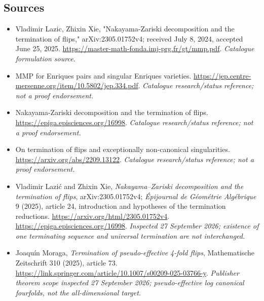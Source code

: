 \documentclass[11pt,a4paper]{article}
\numberwithin{equation}{section}
\begin{document}
\needspace{170mm}
\subsection{Sources}
\begin{itemize}\raggedright
\item[\textnormal{[S1]}]\hypertarget{source:72:1}{} Vladimir Lazic, Zhixin Xie, "Nakayama-Zariski decomposition and the termination of flips," arXiv:2305.01752v4; received July 8, 2024, accepted June 25, 2025.
\url{https://master-math-fonda.imj-prg.fr/gt/mmp.pdf}.
{\small\textit{Catalogue formulation source.}}
\item[\textnormal{[S2]}]\hypertarget{source:72:2}{} MMP for Enriques pairs and singular Enriques varieties.
\url{https://jep.centre-mersenne.org/item/10.5802/jep.334.pdf}.
{\small\textit{Catalogue research/status reference; not a proof endorsement.}}
\item[\textnormal{[S3]}]\hypertarget{source:72:3}{} Nakayama-Zariski decomposition and the termination of flips.
\url{https://epiga.episciences.org/16998}.
{\small\textit{Catalogue research/status reference; not a proof endorsement.}}
\item[\textnormal{[S4]}]\hypertarget{source:72:4}{} On termination of flips and exceptionally non-canonical singularities.
\url{https://arxiv.org/abs/2209.13122}.
{\small\textit{Catalogue research/status reference; not a proof endorsement.}}
\item[\textnormal{[E1]}]\hypertarget{extra:72:1}{} Vladimir Lazi\'c and
Zhixin Xie, \emph{Nakayama--Zariski decomposition and the termination of flips},
arXiv:2305.01752v4; \emph{\'Epijournal de G\'eom\'etrie Alg\'ebrique} 9 (2025),
article 24, introduction and hypotheses of the termination reductions.
\url{https://arxiv.org/html/2305.01752v4}.
\url{https://epiga.episciences.org/16998}.
{\small\textit{Inspected 27 September 2026; existence of one terminating
sequence and universal termination are not interchanged.}}
\item[\textnormal{[E2]}]\hypertarget{extra:72:2}{} Joaqu\'in Moraga,
\emph{Termination of pseudo-effective 4-fold flips},
Mathematische Zeitschrift 310 (2025), article 73.
\url{https://link.springer.com/article/10.1007/s00209-025-03766-y}.
{\small\textit{Publisher theorem scope inspected 27 September 2026;
pseudo-effective log canonical fourfolds, not the all-dimensional target.}}
\end{itemize}
\end{document}
